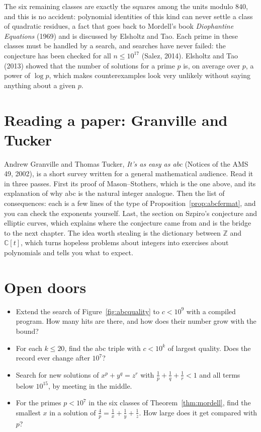 \begin{remark}\label{rem:esrest}
The six remaining classes are exactly the squares among the units modulo $840$, and this is no accident: polynomial identities of this kind can never
settle a class of quadratic residues, a fact that goes back to Mordell's book \emph{Diophantine Equations} (1969) and is discussed by Elsholtz and Tao.
Each prime in these classes must be handled by a search, and searches have never failed: the conjecture has been checked for all $n\le10^{17}$ (Salez,
2014). Elsholtz and Tao (2013) showed that the number of solutions for a prime $p$ is, on average over $p$, a power of $\log p$, which makes
counterexamples look very unlikely without saying anything about a given $p$.
\end{remark}

\section{Reading a paper: Granville and Tucker}

Andrew Granville and Thomas Tucker, \emph{It's as easy as abc} (Notices of the AMS 49, 2002), is a short survey written for a general mathematical
audience. Read it in three passes. First its proof of Mason--Stothers, which is the one above, and its explanation of why abc is the natural integer
analogue. Then the list of consequences: each is a few lines of the type of Proposition~\ref{prop:abcfermat}, and you can check the exponents yourself.
Last, the section on Szpiro's conjecture and elliptic curves, which explains where the conjecture came from and is the bridge to the next chapter. The
idea worth stealing is the dictionary between $\mathbb Z$ and $\mathbb C[t]$, which turns hopeless problems about integers into exercises about
polynomials and tells you what to expect.

\section{Open doors}

\begin{itemize}
\item Extend the search of Figure~\ref{fig:abcquality} to $c<10^9$ with a compiled program. How many hits are there, and how does their number grow
with the bound?
\item For each $k\le20$, find the abc triple with $c<10^k$ of largest quality. Does the record ever change after $10^7$?
\item Search for new solutions of $x^p+y^q=z^r$ with $\frac1p+\frac1q+\frac1r<1$ and all terms below $10^{15}$, by meeting in the middle.
\item For the primes $p<10^7$ in the six classes of Theorem~\ref{thm:mordell}, find the smallest $x$ in a solution of $\frac4p=\frac1x+\frac1y+\frac1z$.
How large does it get compared with $p$?
\end{itemize}

